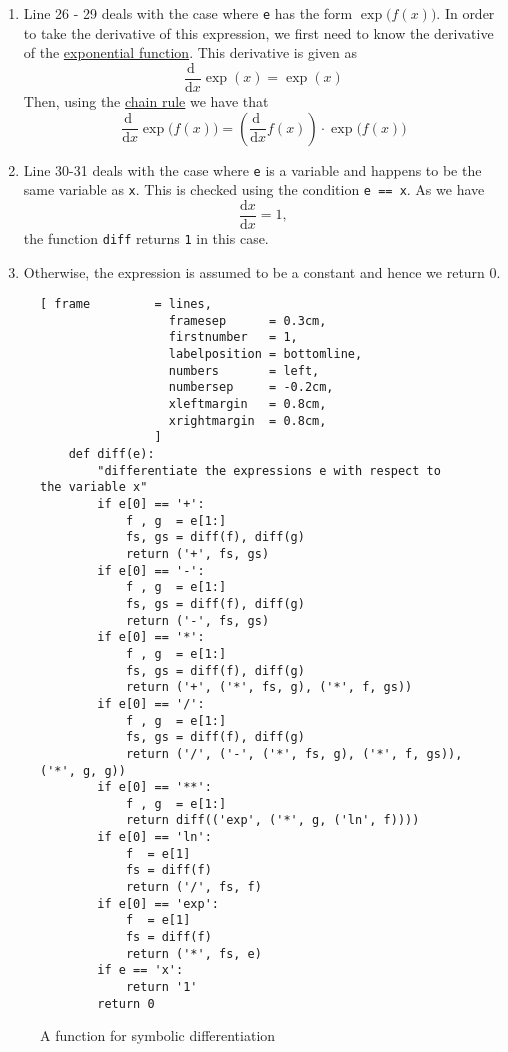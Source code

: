\begin{enumerate}
\item Line 26 - 29 deals with the case where \texttt{e} has the form $\exp\bigl(f(x)\bigr)$.  
      In order to take the derivative of this expression, we first need to know the derivative of the 
      \href{https://en.wikipedia.org/wiki/Exponential\_function}{exponential function}.  
      This derivative is given as 
      $$ \frac{\mathrm{d}\;}{\mathrm{d}x} \exp(x) = \exp(x)$$    
      Then, using the \href{https://en.wikipedia.org/wiki/Chain\_rule}{chain rule} we have that
      $$\frac{\mathrm{d}\;}{\mathrm{d}x} \exp\bigl(f(x)\bigr) = \left(\frac{\mathrm{d}\;}{\mathrm{d}x} f(x)\right) \cdot \exp\bigl(f(x)\bigr) $$
\item Line 30-31 deals with the case where \texttt{e} is a variable and happens to be the same variable as
      \texttt{x}.  This is checked using the condition    
      \texttt{e == x}.  As we have
      $$\frac{\mathrm{d}x}{\mathrm{d}x} = 1,$$
      the function \texttt{diff} returns \texttt{1} in this case.  
\item Otherwise, the expression is assumed to be a constant and hence we return 0.
\end{enumerate}


\begin{figure}[!ht]
\centering
\begin{Verbatim}[ frame         = lines, 
                  framesep      = 0.3cm, 
                  firstnumber   = 1,
                  labelposition = bottomline,
                  numbers       = left,
                  numbersep     = -0.2cm,
                  xleftmargin   = 0.8cm,
                  xrightmargin  = 0.8cm,
                ]
    def diff(e):
        "differentiate the expressions e with respect to the variable x"
        if e[0] == '+':
            f , g  = e[1:]
            fs, gs = diff(f), diff(g)
            return ('+', fs, gs)
        if e[0] == '-':
            f , g  = e[1:]
            fs, gs = diff(f), diff(g)
            return ('-', fs, gs)
        if e[0] == '*':
            f , g  = e[1:]
            fs, gs = diff(f), diff(g)
            return ('+', ('*', fs, g), ('*', f, gs))
        if e[0] == '/':
            f , g  = e[1:]
            fs, gs = diff(f), diff(g)
            return ('/', ('-', ('*', fs, g), ('*', f, gs)), ('*', g, g))
        if e[0] == '**':
            f , g  = e[1:]
            return diff(('exp', ('*', g, ('ln', f))))
        if e[0] == 'ln':
            f  = e[1]
            fs = diff(f) 
            return ('/', fs, f)
        if e[0] == 'exp':
            f  = e[1]
            fs = diff(f) 
            return ('*', fs, e)
        if e == 'x':
            return '1'
        return 0                  
\end{Verbatim}
\vspace*{-0.3cm}
\caption{A function for symbolic differentiation}
\label{fig:diff.py}
\end{figure}


